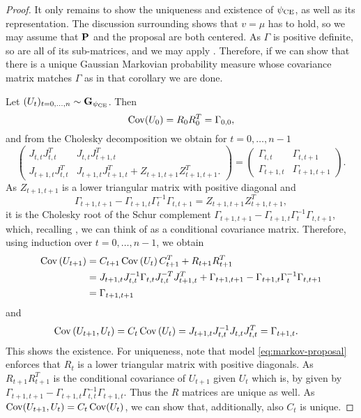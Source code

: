 \begin{proof}
    It only remains to show the uniqueness and existence of $\pce$, as well as its representation.
    The discussion surrounding  shows that $v = \mu$ has to hold, so we may assume that $\P$ and the proposal are both centered.
    As $\Gamma$ is positive definite, so are all of its sub-matrices, and we may apply . Therefore, if we can show that there is a unique Gaussian Markovian probability measure whose covariance matrix matches $\Gamma$ as in that corollary we are done. 

    Let $(U_{t})_{t = 0, \dots, n} \sim \G_{\pce}$. Then 
    $$
        \cov (U_{0}) = R_{0}R_{0}^T = \Gamma_{0,0},
    $$
    and from the Cholesky decomposition we obtain for $t = 0, \dots, n - 1$
    $$
        \begin{pmatrix}
            J_{t,t}J_{t,t}^T & J_{t,t}J_{t + 1, t}^T\\
            J_{t +1, t}J_{t,t}^T & J_{t + 1, t}J_{t + 1, t}^{T} + Z_{t + 1, t + 1} Z_{t + 1, t + 1}^T.
        \end{pmatrix} = \begin{pmatrix}
            \Gamma_{t,t} & \Gamma_{t, t + 1} \\
            \Gamma_{t + 1, t} & \Gamma_{t + 1, t + 1}
        \end{pmatrix}.
    $$
    As $Z_{t + 1, t + 1}$ is a lower triangular matrix with positive diagonal and
    $$
        \Gamma_{t + 1, t + 1} - \Gamma_{t+1, t}\Gamma_{t}^{-1}\Gamma_{t, t +1} = Z_{t + 1, t + 1} Z_{t + 1, t + 1}^T,
    $$
    it is the Cholesky root of the Schur complement $\Gamma_{t + 1, t + 1} - \Gamma_{t+1, t}\Gamma_{t}^{-1}\Gamma_{t, t +1}$, which, recalling , we can think of as a conditional covariance matrix. 
    Therefore, using induction over $t = 0, \dots, n - 1$, we obtain
    \begin{align*}
        \cov \left( U_{t + 1} \right) &= C_{t + 1}\cov \left( U_{t} \right) C^T_{t + 1} + R_{t + 1}R_{t + 1}^T \\
            &= J_{t + 1, t}J_{t,t}^{-1}\Gamma_{t,t}J_{t,t}^{-T}J_{t+1,t}^T + \Gamma_{t + 1, t + 1} - \Gamma_{t+1, t}\Gamma_{t}^{-1}\Gamma_{t, t +1}\\
            &= \Gamma_{t + 1, t + 1}
    \end{align*}
    and
    \begin{align*}
        \cov \left( U_{t + 1}, U_{t} \right) &= C_{t}\cov \left( U_{t} \right) = J_{t + 1, t}J_{t,t}^{-1} J_{t,t} J_{t, t}^T = \Gamma_{t + 1, t}.
    \end{align*}
    This shows the existence. For uniqueness, note that model \eqref{eq:markov-proposal} enforces that $R_{t}$ is a lower triangular matrix with positive diagonals. As $R_{t + 1}R_{t + 1}^T$ is the conditional covariance of $U_{t + 1}$ given $U_{t}$ which is, by  given by $\Gamma_{t + 1, t + 1} - \Gamma_{t + 1, t}\Gamma_{t,t}^{-1}\Gamma_{t + 1, t}$. Thus the $R$ matrices are unique as well. As $\cov (U_{t + 1}, U_{t}) = C_{t}\cov (U_{t})$, we can show that, additionally, also $C_{t}$ is unique.
\end{proof}

